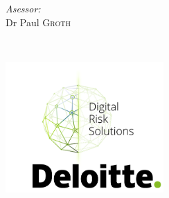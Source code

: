 \documentclass{article}
\newcommand{\red}[1]{{\color{red}{#1}}}
\begin{document}
\begin{titlepage}
\begin{minipage}[t]{0.4\textwidth}
\begin{flushright}
\emph{Asessor:} \\

Dr Paul \textsc{Groth}\\

\end{flushright}

\end{minipage}\\[2cm]








\begin{minipage}{\textwidth}
    \centering
    \includegraphics[height=5cm]{data/images/deloitte_thesis_cover2.png} %
\end{minipage}


 




\vfill %



\end{titlepage}
\end{document}
